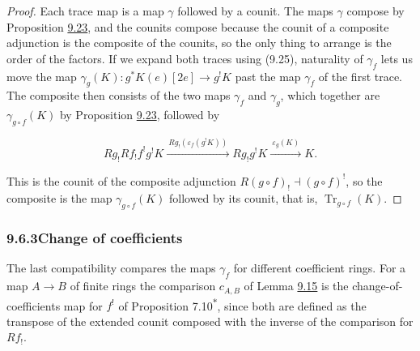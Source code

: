 \documentclass[11pt]{article}
\newcommand{\bpout}[1]{#1\textsuperscript{\hyperlink{bp-outside}{\ensuremath{\ast}}}}
\begin{document}
\begin{proof}[{Proof}]\label{bp89}%
Each trace map is a map \(\gamma\) followed by a counit. The maps \(\gamma\) compose by Proposition \hyperref[bp81]{9.23}, and the counits compose because the counit of a composite adjunction is the composite of the counits, so the only thing to arrange is the order of the factors. If we expand both traces using (9.25), naturality of \(\gamma_f\) lets us move the map \(\gamma_g(K):g^{*}K(e)[2e]\to g^!K\) past the map \(\gamma_f\) of the first trace. The composite then consists of the two maps \(\gamma_f\) and \(\gamma_g\), which together are \(\gamma_{g\circ f}(K)\) by Proposition \hyperref[bp81]{9.23}, followed by

\[
Rg_!Rf_!f^!g^!K
\xrightarrow{\ Rg_!(\varepsilon_{f}(g^!K))\ }
Rg_!g^!K
\xrightarrow{\ \varepsilon_{g}(K)\ }K.
\]

This is the counit of the composite adjunction \(R(g\circ f)_!\dashv(g\circ f)^!\), so the composite is the map \(\gamma_{g\circ f}(K)\) followed by its counit, that is, \(\operatorname{Tr}_{g\circ f}(K)\).
\end{proof}


\subsubsection*{\texorpdfstring{9.6.3\quad Change of coefficients}{9.6.3 Change of coefficients}}
\label{bp90}%
\label{bp91}%
The last compatibility compares the maps \(\gamma_f\) for different coefficient rings. For a map \(A\to B\) of finite rings the comparison \(c_{A,B}\) of Lemma \hyperref[bp49]{9.15} is the change-of-coefficients map for \(f^!\) of Proposition \bpout{7.10}, since both are defined as the transpose of the extended counit composed with the inverse of the comparison for \(Rf_!\).
\end{document}
